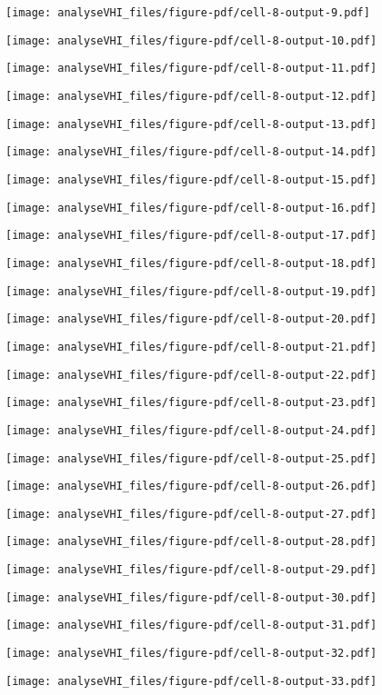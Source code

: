 \documentclass[
  10pt,
  letterpaper,
  DIV=11,
  numbers=noendperiod]{scrartcl}
\begin{document}
\texttt{[image: analyseVHI\_files/figure-pdf/cell-8-output-9.pdf]}

\texttt{[image: analyseVHI\_files/figure-pdf/cell-8-output-10.pdf]}

\texttt{[image: analyseVHI\_files/figure-pdf/cell-8-output-11.pdf]}

\texttt{[image: analyseVHI\_files/figure-pdf/cell-8-output-12.pdf]}

\texttt{[image: analyseVHI\_files/figure-pdf/cell-8-output-13.pdf]}

\texttt{[image: analyseVHI\_files/figure-pdf/cell-8-output-14.pdf]}

\texttt{[image: analyseVHI\_files/figure-pdf/cell-8-output-15.pdf]}

\texttt{[image: analyseVHI\_files/figure-pdf/cell-8-output-16.pdf]}

\texttt{[image: analyseVHI\_files/figure-pdf/cell-8-output-17.pdf]}

\texttt{[image: analyseVHI\_files/figure-pdf/cell-8-output-18.pdf]}

\texttt{[image: analyseVHI\_files/figure-pdf/cell-8-output-19.pdf]}

\texttt{[image: analyseVHI\_files/figure-pdf/cell-8-output-20.pdf]}

\texttt{[image: analyseVHI\_files/figure-pdf/cell-8-output-21.pdf]}

\texttt{[image: analyseVHI\_files/figure-pdf/cell-8-output-22.pdf]}

\texttt{[image: analyseVHI\_files/figure-pdf/cell-8-output-23.pdf]}

\texttt{[image: analyseVHI\_files/figure-pdf/cell-8-output-24.pdf]}

\texttt{[image: analyseVHI\_files/figure-pdf/cell-8-output-25.pdf]}

\texttt{[image: analyseVHI\_files/figure-pdf/cell-8-output-26.pdf]}

\texttt{[image: analyseVHI\_files/figure-pdf/cell-8-output-27.pdf]}

\texttt{[image: analyseVHI\_files/figure-pdf/cell-8-output-28.pdf]}

\texttt{[image: analyseVHI\_files/figure-pdf/cell-8-output-29.pdf]}

\texttt{[image: analyseVHI\_files/figure-pdf/cell-8-output-30.pdf]}

\texttt{[image: analyseVHI\_files/figure-pdf/cell-8-output-31.pdf]}

\texttt{[image: analyseVHI\_files/figure-pdf/cell-8-output-32.pdf]}

\texttt{[image: analyseVHI\_files/figure-pdf/cell-8-output-33.pdf]}
\end{document}

